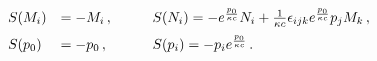 \begin{equation}\begin{array}{lll}S(M_i) & = -M_i\, ,\qquad & S(N_i)
 = -e^{\frac{p_0}{\kappa c}}N_i+{\frac{1}{\kappa
c}}\epsilon_{ijk}e^{\frac{p_0}{\kappa c}}p_j M_k\, ,\medskip\cr
S(p_0)& = -p_0\, , & S(p_i) = -p_i e^{\frac{p_0}{\kappa c}}\, .
\end{array}\label{r24}\end{equation} 
